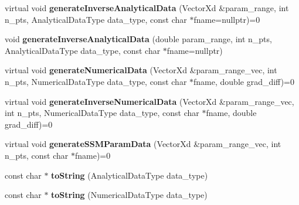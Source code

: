 \begin{DoxyCompactItemize}
\item 
\hypertarget{classDiagBase_a3750265ecae09e3f48b441475560bd20}{virtual void {\bfseries generate\-Inverse\-Analytical\-Data} (Vector\-Xd \&param\-\_\-range, int n\-\_\-pts, Analytical\-Data\-Type data\-\_\-type, const char $\ast$fname=nullptr)=0}\label{classDiagBase_a3750265ecae09e3f48b441475560bd20}

\item 
\hypertarget{classDiagBase_ad8b6f94744ede59ee7138f6b1864d399}{void {\bfseries generate\-Inverse\-Analytical\-Data} (double param\-\_\-range, int n\-\_\-pts, Analytical\-Data\-Type data\-\_\-type, const char $\ast$fname=nullptr)}\label{classDiagBase_ad8b6f94744ede59ee7138f6b1864d399}

\item 
\hypertarget{classDiagBase_ad0fe63d853e3a68c05238c387fa4e9e7}{virtual void {\bfseries generate\-Numerical\-Data} (Vector\-Xd \&param\-\_\-range\-\_\-vec, int n\-\_\-pts, Numerical\-Data\-Type data\-\_\-type, const char $\ast$fname, double grad\-\_\-diff)=0}\label{classDiagBase_ad0fe63d853e3a68c05238c387fa4e9e7}

\item 
\hypertarget{classDiagBase_a1ced10e03d9d0c18ce9a7552f819f03b}{virtual void {\bfseries generate\-Inverse\-Numerical\-Data} (Vector\-Xd \&param\-\_\-range\-\_\-vec, int n\-\_\-pts, Numerical\-Data\-Type data\-\_\-type, const char $\ast$fname, double grad\-\_\-diff)=0}\label{classDiagBase_a1ced10e03d9d0c18ce9a7552f819f03b}

\item 
\hypertarget{classDiagBase_a44290bbaff4edc2862e6a6b14791118a}{virtual void {\bfseries generate\-S\-S\-M\-Param\-Data} (Vector\-Xd \&param\-\_\-range\-\_\-vec, int n\-\_\-pts, const char $\ast$fname)=0}\label{classDiagBase_a44290bbaff4edc2862e6a6b14791118a}

\item 
\hypertarget{classDiagBase_a0d84250f6110072f3ca9dbff0cd6e04c}{const char $\ast$ {\bfseries to\-String} (Analytical\-Data\-Type data\-\_\-type)}\label{classDiagBase_a0d84250f6110072f3ca9dbff0cd6e04c}

\item 
\hypertarget{classDiagBase_ad416e2fbded87de6c9752fcccd71fca3}{const char $\ast$ {\bfseries to\-String} (Numerical\-Data\-Type data\-\_\-type)}\label{classDiagBase_ad416e2fbded87de6c9752fcccd71fca3}

\end{DoxyCompactItemize}
